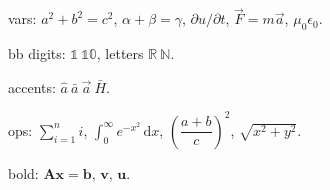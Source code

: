 \documentclass{article}
\begin{document}
vars: $a^2+b^2=c^2$, $\alpha+\beta=\gamma$, $\partial u/\partial t$,
$\vec{F}=m\vec{a}$, $\mu_0\epsilon_0$.

bb digits: $\mathbb{1}\ \mathbb{10}$, letters $\mathbb{R}\ \mathbb{N}$.

accents: $\hat{a}\ \bar{a}\ \vec{a}\ \bar{H}$.

ops: $\sum_{i=1}^{n} i$, $\int_{0}^{\infty} e^{-x^2}\,\mathrm{d}x$,
$\left( \dfrac{a+b}{c} \right)^{2}$, $\sqrt{x^{2}+y^{2}}$.

bold: $\mathbf{Ax}=\mathbf{b}$, $\symbf{v}$, $\symbf{u}$.
\end{document}
